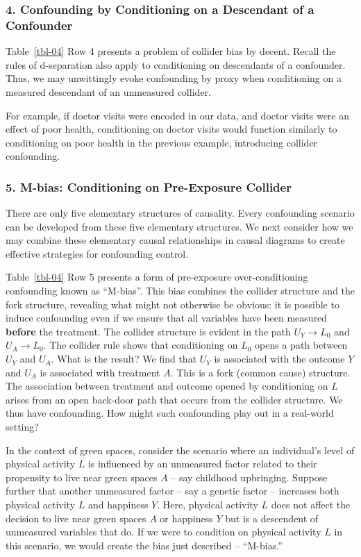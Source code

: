 \documentclass[
  singlecolumn]{article}
\begin{document}
\subsubsection{4. Confounding by Conditioning on a Descendant of a
Confounder}\label{confounding-by-conditioning-on-a-descendant-of-a-confounder}

Table~\ref{tbl-04} Row 4 presents a problem of collider bias by decent.
Recall the rules of d-separation also apply to conditioning on
descendants of a confounder. Thus, we may unwittingly evoke confounding
by proxy when conditioning on a measured descendant of an unmeasured
collider.

For example, if doctor visits were encoded in our data, and doctor
visits were an effect of poor health, conditioning on doctor visits
would function similarly to conditioning on poor health in the previous
example, introducing collider confounding.

\subsubsection{5. M-bias: Conditioning on Pre-Exposure
Collider}\label{m-bias-conditioning-on-pre-exposure-collider}

There are only five elementary structures of causality. Every
confounding scenario can be developed from these five elementary
structures. We next consider how we may combine these elementary causal
relationships in causal diagrams to create effective strategies for
confounding control.

Table~\ref{tbl-04} Row 5 presents a form of pre-exposure
over-conditioning confounding known as ``M-bias''. This bias combines
the collider structure and the fork structure, revealing what might not
otherwise be obvious: it is possible to induce confounding even if we
ensure that all variables have been measured \textbf{before} the
treatment. The collider structure is evident in the path \(U_Y \to L_0\)
and \(U_A \to L_0\). The collider rule shows that conditioning on
\(L_0\) opens a path between \(U_Y\) and \(U_A\). What is the result? We
find that \(U_Y\) is associated with the outcome \(Y\) and \(U_A\) is
associated with treatment \(A\). This is a fork (common cause)
structure. The association between treatment and outcome opened by
conditioning on \(L\) arises from an open back-door path that occurs
from the collider structure. We thus have confounding. How might such
confounding play out in a real-world setting?

In the context of green spaces, consider the scenario where an
individual's level of physical activity \(L\) is influenced by an
unmeasured factor related to their propensity to live near green spaces
\(A\) -- say childhood upbringing. Suppose further that another
unmeasured factor -- say a genetic factor -- increases both physical
activity \(L\) and happiness \(Y\). Here, physical activity \(L\) does
not affect the decision to live near green spaces \(A\) or happiness
\(Y\) but is a descendent of unmeasured variables that do. If we were to
condition on physical activity \(L\) in this scenario, we would create
the bias just described -- ``M-bias.''
\end{document}
